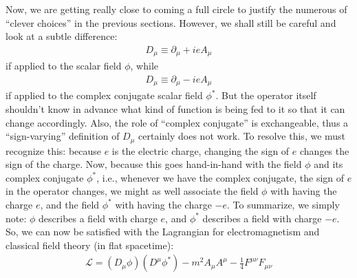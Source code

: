 \documentclass[a4paper,11pt]{article}
\numberwithin{equation}{section}
\theoremstyle{definition}
\newcommand{\p}{\partial}
\newcommand{\lag}{\mathcal{L}}
\begin{document}
Now, we are getting really close to coming a full circle to justify the numerous of ``clever choices'' in the previous sections. However, we shall still be careful and look at a subtle difference:
\begin{align}
D_\mu \equiv \p_\mu + ieA_\mu
\end{align}
if applied to the scalar field $\phi$, while 
\begin{align}
D_\mu \equiv \p_\mu -ieA_\mu
\end{align}
if applied to the complex conjugate scalar field $\phi^*$. But the operator itself shouldn't know in advance what kind of function is being fed to it so that it can change accordingly. Also, the role of ``complex conjugate'' is exchangeable, thus a ``sign-varying'' definition of $D_\mu$ certainly does not work. To resolve this, we must recognize this: because $e$ is the electric charge, changing the sign of $e$ changes the sign of the charge. Now, because this goes hand-in-hand with the field $\phi$ and its complex conjugate $\phi^*$, i.e., whenever we have the complex conjugate, the sign of $e$ in the operator changes, we might as well associate the field $\phi$ with having the charge $e$, and the field $\phi^*$ with having the charge $-e$. To summarize, we simply note: $\phi$ describes a field with charge $e$, and $\phi^*$ describes a field with charge $-e$. So, we can now be satisfied with the Lagrangian for electromagnetism and classical field theory (in flat spacetime):
\begin{align}
\boxed{ \lag = (D_\mu\phi)(D^\mu\phi^*) - m^2 A_\mu A^\mu - \frac{1}{4}F^{\mu\nu}F_{\mu\nu}}
\end{align}
\end{document}
